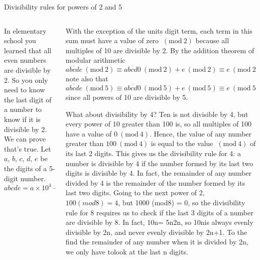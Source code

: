 \documentclass[9pt,aspectratio=169]{beamer}
\newcommand{\Mod}[1]{\ (\mathrm{mod}\ #1)}
\begin{document}
\begin{frame}{Divisibility rules for powers of 2 and 5}
  \begin{columns}[T]
    \begin{column}{0.5\textwidth}
      In elementary school you learned that all even numbers are divisible by 2.  So you only need to know the last digit of a number to know if it is divisible by 2.  We can prove that’s true.  Let $a$, $b$, $c$, $d$, $e$ be the digits of a 5-digit number.
      \[
        \overline{abcde} = a \times 10^4 + b \times 10^3 + c \times 10^2+ d \times 10^1+ e \times 10^0.
      \]
      
    \end{column}
    \begin{column}{0.5\textwidth}
      With the exception of the units digit term, each term in this sum must have a value of zero $\Mod{2}$ because all multiples of 10 are divisible by 2. By the addition theorem of modular arithmetic
      \[
        \overline{abcde}\Mod{2} \equiv \overline{abcd0}\Mod{2} + e\Mod{2} \equiv e\Mod{2} 
      \]
      note also that
      \[
        \overline{abcde}\Mod{5} \equiv \overline{abcd0}\Mod{5} + e\Mod{5} \equiv e\Mod{5}  
      \]  
      since all powers of 10 are divisible by 5.
      
      What about divisibility by 4?  Ten is not divisible by 4, but every power of 10 greater than 100 is, so all multiples of 100 have a value of $0\Mod{4}$.  Hence, the value of any number greater than $100\Mod{4}$ is equal to the value $\Mod{4}$ of its last 2 digits.  This gives us the divisibility rule for 4: a number is divisible by 4 if the number formed by its last two digits is divisible by 4. In fact, the remainder of any number divided by 4 is the remainder of the number formed by its last two digits.  Going to the next power of 2, $100 (mod8) = 4$, but 1000 (mod8) = 0, so the divisibility rule for 8 requires us to check if the last 3 digits of a number are divisible by 8.  In fact, 10n= 5n2n, so 10nis always evenly divisible by 2n, and never evenly divisible by 2n+1.  To the find the remainder of any number when it is divided by 2n, we only have tolook at the last n digits.
    \end{column}
  \end{columns}
\end{frame}


\end{document}
